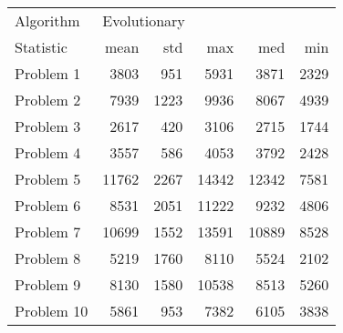 \begin{tabular}{lrrrrr}
\toprule
Algorithm & \multicolumn{5}{l}{Evolutionary} \\
Statistic &         mean &   std &    max &    med &   min \\
\midrule
Problem 1  &         3803 &   951 &   5931 &   3871 &  2329 \\
Problem 2  &         7939 &  1223 &   9936 &   8067 &  4939 \\
Problem 3  &         2617 &   420 &   3106 &   2715 &  1744 \\
Problem 4  &         3557 &   586 &   4053 &   3792 &  2428 \\
Problem 5  &        11762 &  2267 &  14342 &  12342 &  7581 \\
Problem 6  &         8531 &  2051 &  11222 &   9232 &  4806 \\
Problem 7  &        10699 &  1552 &  13591 &  10889 &  8528 \\
Problem 8  &         5219 &  1760 &   8110 &   5524 &  2102 \\
Problem 9  &         8130 &  1580 &  10538 &   8513 &  5260 \\
Problem 10 &         5861 &   953 &   7382 &   6105 &  3838 \\
\bottomrule
\end{tabular}
